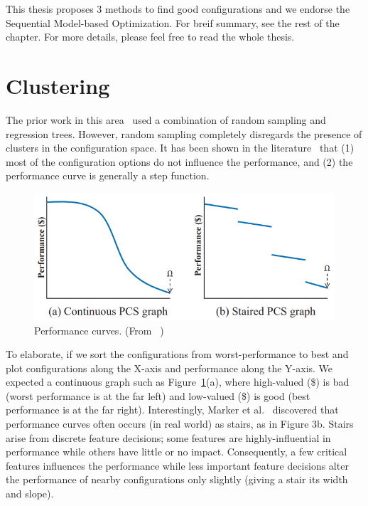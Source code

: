 This thesis proposes 3 methods to find good configurations and we endorse the Sequential Model-based Optimization. For breif summary, see the rest of the chapter. For more details, please feel free to read the whole thesis. 


\section{Clustering}
The prior work in this area~\cite{guo2013variability, sarkar2015cost} used a combination of random sampling and regression trees. However, random sampling completely disregards the presence of clusters in the configuration space. It has been shown in the literature~\cite{oh2017finding} that (1) most of the configuration options do not influence the performance, and (2) the performance curve is generally a step function. 

\begin{figure}[!htbp]
    \centering
    \includegraphics[width=0.8\linewidth]{Chapter-Introduction/Figures/stairs.png}
    \caption{Performance curves. (From ~\cite{oh2017finding})}
    \label{fig:chap1_stairs}
\end{figure}

To elaborate, if we sort the configurations from worst-performance to best and
plot configurations along the X-axis and performance along the
Y-axis. We expected a continuous graph
such as Figure~\ref{fig:chap1_stairs}(a), where high-valued (\$) is bad (worst performance is at the far left) and low-valued (\$) is good (best performance is at the
far right). Interestingly, Marker et al.~\cite{marker2014understanding} discovered that performance curves often occurs (in real world) as stairs, as in Figure 3b. Stairs arise from discrete feature decisions;
some features are highly-influential in performance while others
have little or no impact. Consequently, a few critical features
influences the performance while less important feature decisions alter the performance of nearby configurations only slightly (giving a stair its width and slope).

